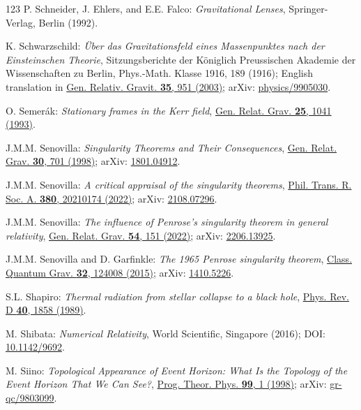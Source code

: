 \begin{thebibliography}{123}
P. Schneider, J. Ehlers, and E.E. Falco:
{\em Gravitational Lenses},
Springer-Verlag, Berlin (1992).

K. Schwarzschild:
{\em \"Uber das Gravitationsfeld eines Massenpunktes nach der Einsteinschen Theorie},
Sitzungsberichte der K\"oniglich Preussischen Akademie der Wissenschaften zu Berlin, Phys.-Math. Klasse 1916, 189 (1916);
English translation in \href{https://doi.org/10.1023/A:1022971926521}{Gen. Relativ. Gravit. {\bf 35}, 951 (2003)};
arXiv: \href{https://arxiv.org/abs/physics/9905030}{physics/9905030}.

O. Semer\'ak:
{\em Stationary frames in the Kerr field},
\href{https://doi.org/10.1007/BF00763554}{Gen. Relat. Grav. {\bf 25}, 1041 (1993)}.

J.M.M. Senovilla:
{\em Singularity Theorems and Their Consequences},
\href{https://doi.org/10.1023/A:1018801101244}{Gen. Relat. Grav. {\bf 30}, 701 (1998)};
arXiv: \href{https://arxiv.org/abs/1801.04912}{1801.04912}.

J.M.M. Senovilla:
{\em A critical appraisal of the singularity theorems},
\href{https://doi.org/10.1098/rsta.2021.0174}{Phil. Trans. R. Soc. A. {\bf 380}, 20210174 (2022)};
arXiv: \href{https://arxiv.org/abs/2108.07296}{2108.07296}.

J.M.M. Senovilla:
{\em The influence of Penrose’s singularity theorem in general relativity},
\href{https://doi.org/10.1007/s10714-022-03038-8}{Gen. Relat. Grav.  {\bf 54}, 151 (2022)};
arXiv: \href{https://arxiv.org/abs/2206.13925}{2206.13925}.

J.M.M. Senovilla and D. Garfinkle:
{\em The 1965 Penrose singularity theorem},
\href{https://doi.org/10.1088/0264-9381/32/12/124008}{Class. Quantum Grav. {\bf 32}, 124008 (2015)};
arXiv: \href{https://arxiv.org/abs/1410.5226}{1410.5226}.

S.L. Shapiro:
{\em Thermal radiation from stellar collapse to a black hole},
\href{https://doi.org/10.1103/PhysRevD.40.1858}{Phys. Rev. D {\bf 40}, 1858 (1989)}.

M. Shibata:
{\em Numerical Relativity},
World Scientific, Singapore (2016);
DOI: \href{https://doi.org/10.1142/9692}{10.1142/9692}.

M. Siino: {\em Topological Appearance of Event Horizon:
What Is the Topology of the Event Horizon That We Can See?},
\href{https://doi.org/10.1143/PTP.99.1}{Prog. Theor. Phys. {\bf 99}, 1 (1998)};
arXiv: \href{https://arxiv.org/abs/gr-qc/9803099}{gr-qc/9803099}.


\end{thebibliography}
